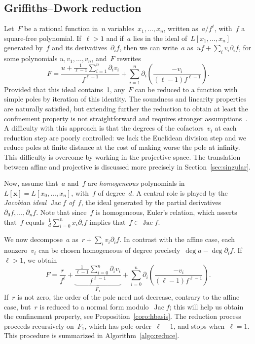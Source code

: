 \documentclass{sig-alternate}
\newcommand{\Lx}{L[\mathbf x]}
\DeclareMathOperator{\Jac}{Jac}
\begin{document}
\subsection{Griffiths--Dwork reduction}
\noindent Let~$F$ be a rational function in~$n$ variables~$x_1,\dotsc,x_n$, written as~$a/f^\ell$, with~$f$ a square-free polynomial.
If~$\ell>1$ and if~$a$ lies in the ideal of~$L[x_1,\dots,x_n]$ generated by~$f$ and its derivatives~$\partial_i f$,
then we can write~$a$ as~$uf+\sum_iv_i\partial_if$,
for some polynomials $u,v_1,\ldots,v_n$, and~$F$ rewrites
\[
  F=  \frac{u+\tfrac{1}{\ell-1}\sum_{i=1}^n \partial_i v_i}{f^{\ell-1}} + \sum_{i=1}^n\partial_i\left( \frac{-v_i}{(\ell-1)f^{\ell-1}} \right).
\]
Provided that  this ideal contains~1,
any~$F$ can be reduced to a function with simple poles by iteration of this identity.
The soundness and linearity properties are naturally satisfied, but extending further the reduction
to obtain at least the confinement property is not straightforward and requires stronger assumptions~\cite[\S 4]{Mov11a}.
A difficulty with this approach is that the degrees of the cofactors~$v_i$ at each reduction step are poorly controlled: we lack the Euclidean division step and we reduce poles at finite distance at the cost of making worse the pole at infinity. This difficulty is overcome by working in the projective space. The translation between affine and projective is discussed more precisely in Section~\ref{sec:singular}.

Now, assume that~$a$ and~$f$ are \emph{homogeneous} polynomials in~$\Lx=L[x_0, \dots,x_n]$, with~$f$ of degree~$d$.
A central role is played by the \emph{Jacobian ideal $\Jac f$ of~$f$}, the ideal generated by the partial derivatives $\partial_0f,\dots,\partial_n f$.
Note that since~$f$ is homogeneous, Euler's relation, which asserts that~$f$ equals~$\frac1d  \sum_{i=0}^n x_i\partial_if$
implies that~$f\in\Jac f$. 

We now decompose~$a$ as~$r + \sum_i v_i \partial_i f$. In contrast with the
affine case, each nonzero~$v_i$ can be chosen homogeneous of degree precisely~$\deg a - \deg\partial_i f$.
If~$\ell>1$, we obtain
\begin{equation}\label{eqn:reduce-identity}
  F = \frac{r}{f^\ell} + \underbrace{\frac{\tfrac{1}{\ell-1}\sum_{i=0}^n \partial_i v_i}{f^{\ell-1}}}_{F_1}+\sum_{i=0}^n\partial_i\left( \frac{-v_i}{(\ell-1)f^{\ell-1}} \right).
\end{equation}
If~$r$ is not zero, the order of the pole need not decrease, contrary to the affine case,  
but~$r$ is reduced to a normal form modulo~$\Jac f$; this will help us obtain the confinement property, see Proposition~\ref{coro:hbasis}.
The reduction process proceeds recursively on~$F_1$,  which has pole order~$\ell-1$, and stops when~$\ell=1$.
This procedure is summarized in Algorithm~\ref{algo:reduce}.
\end{document}
